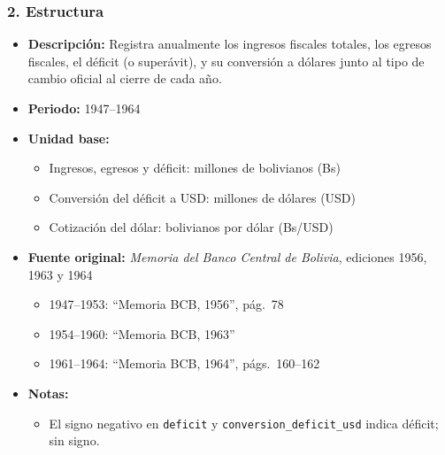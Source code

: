 \documentclass[12pt,a4paper]{article}
\begin{document}
\subsubsection*{2. Estructura}
\begin{itemize}
  \item \textbf{Descripción:} Registra anualmente los ingresos fiscales totales, los egresos fiscales, el déficit (o superávit), y su conversión a dólares junto al tipo de cambio oficial al cierre de cada año.
  \item \textbf{Periodo:} 1947--1964
  \item \textbf{Unidad base:}
    \begin{itemize}
      \item Ingresos, egresos y déficit: millones de bolivianos (Bs)  
      \item Conversión del déficit a USD: millones de dólares (USD)  
      \item Cotización del dólar: bolivianos por dólar (Bs/USD)
    \end{itemize}
  \item \textbf{Fuente original:} \emph{Memoria del Banco Central de Bolivia}, ediciones 1956, 1963 y 1964  
    \begin{itemize}
      \item 1947–1953: “Memoria BCB, 1956”, pág.\ 78  
      \item 1954–1960: “Memoria BCB, 1963”  
      \item 1961–1964: “Memoria BCB, 1964”, págs.\ 160–162
    \end{itemize}
  \item \textbf{Notas:}
    \begin{itemize}
      \item El signo negativo en \texttt{deficit} y \texttt{conversion\_deficit\_usd} indica déficit; sin signo.  
    \end{itemize}
\end{itemize}
\end{document}
